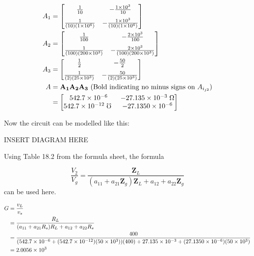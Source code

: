 \begin{enumerate}
{	\begin{align*}
	A_1 &= 
	\left[ \begin{matrix}
	\frac{1}{\Aone} 			& -\frac{\Roone}{\Aone} \\[6pt] 
	\frac{1}{(\Aone) (\Rione) }	& -\frac{\Roone}{(\Aone) (\Rione)}
	\end{matrix}  \right] 
	\\
	A_2 &= 
	\left[ \begin{matrix}
	\frac{1}{\Atwo} 			& -\frac{\Rotwo}{\Atwo} \\[6pt] 
	\frac{1}{(\Atwo) (\Ritwo) }	& -\frac{\Rotwo}{(\Atwo) (\Ritwo)}
	\end{matrix}  \right] 
	\\
	A_3 &= 
	\left[ \begin{matrix}
	\frac{1}{\Athree} 				& -\frac{\Rothree}{\Athree} \\[6pt] 
	\frac{1}{(\Athree) (\Rithree) }	& -\frac{\Rothree}{(\Athree) (\Rithree)}
	\end{matrix}  \right] 
	\\
	A &= \mathbf{A_1 A_2 A_3} \text{ (Bold indicating no minus signs on }A_{i_{j2}})
	\\
	&= \left[ \begin{matrix}
	\Aoneone 			& -\Aonetwo \; \Omega \\ 
	\Atwoone \; \mho \	& -\Atwotwo
	\end{matrix}  \right] 
	\end{align*}
	
	Now the circuit can be modelled like this:
	
	INSERT DIAGRAM HERE
	
	Using Table 18.2 from the formula sheet, the formula
	
	$$ \frac{V_2}{V_g} = \frac{\mathbf{Z}_L}{(a_{11} + a_{21}\mathbf{Z}_g)\mathbf{Z}_L + a_{12} + a_{22}\mathbf{Z}_g} $$
	can be used here.
	
	\begin{align*}
	G &= \frac{v_L}{v_s}
	\\
	&= \frac{R_L}{(a_{11} + a_{21}R_s)R_L + a_{12} + a_{22}R_s}
	\\
	&= \frac{400}{(542.7 \times 10^{-6} + (542.7 \times 10^{-12})(50 \times 10^3))(400) + 27.135 \times 10^{-3} + (27.1350 \times 10^{-6})(50 \times 10^3)}
	\\
	&= 2.0056 \times 10^3
	\end{align*}
	
	}
\end{enumerate}